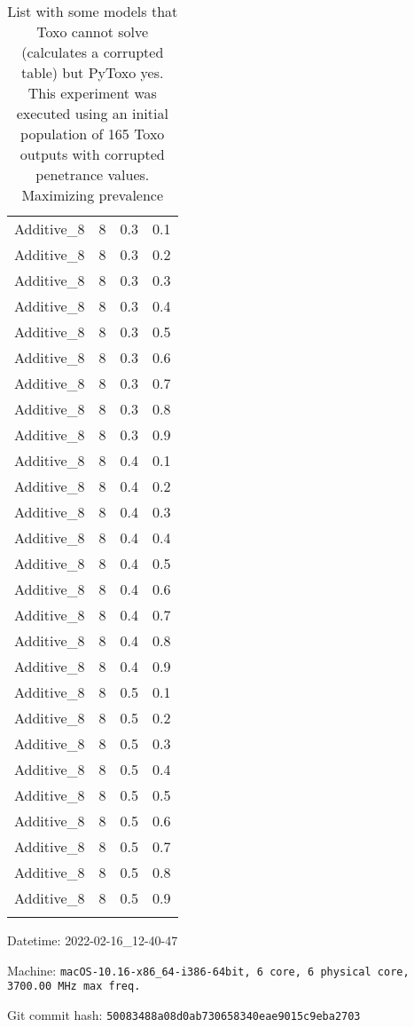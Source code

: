 \documentclass{article}
\begin{document}
\begin{longtable}[H]{lrrr}
 Additive\_8 &       8 &   0.3 &            0.1 \\
 Additive\_8 &       8 &   0.3 &            0.2 \\
 Additive\_8 &       8 &   0.3 &            0.3 \\
 Additive\_8 &       8 &   0.3 &            0.4 \\
 Additive\_8 &       8 &   0.3 &            0.5 \\
 Additive\_8 &       8 &   0.3 &            0.6 \\
 Additive\_8 &       8 &   0.3 &            0.7 \\
 Additive\_8 &       8 &   0.3 &            0.8 \\
 Additive\_8 &       8 &   0.3 &            0.9 \\
 Additive\_8 &       8 &   0.4 &            0.1 \\
 Additive\_8 &       8 &   0.4 &            0.2 \\
 Additive\_8 &       8 &   0.4 &            0.3 \\
 Additive\_8 &       8 &   0.4 &            0.4 \\
 Additive\_8 &       8 &   0.4 &            0.5 \\
 Additive\_8 &       8 &   0.4 &            0.6 \\
 Additive\_8 &       8 &   0.4 &            0.7 \\
 Additive\_8 &       8 &   0.4 &            0.8 \\
 Additive\_8 &       8 &   0.4 &            0.9 \\
 Additive\_8 &       8 &   0.5 &            0.1 \\
 Additive\_8 &       8 &   0.5 &            0.2 \\
 Additive\_8 &       8 &   0.5 &            0.3 \\
 Additive\_8 &       8 &   0.5 &            0.4 \\
 Additive\_8 &       8 &   0.5 &            0.5 \\
 Additive\_8 &       8 &   0.5 &            0.6 \\
 Additive\_8 &       8 &   0.5 &            0.7 \\
 Additive\_8 &       8 &   0.5 &            0.8 \\
 Additive\_8 &       8 &   0.5 &            0.9 \\
\hline

\caption{List with some models that Toxo cannot solve (calculates a corrupted table) but PyToxo yes. This experiment was executed using an initial population of 165 Toxo outputs with corrupted penetrance values. Maximizing prevalence}
\end{longtable}
Datetime: 2022-02-16\_12-40-47

Machine: \texttt{macOS-10.16-x86\_64-i386-64bit, 6 core, 6 physical core, 3700.00 MHz max freq.}

Git commit hash: \texttt{50083488a08d0ab730658340eae9015c9eba2703}
\end{document}
